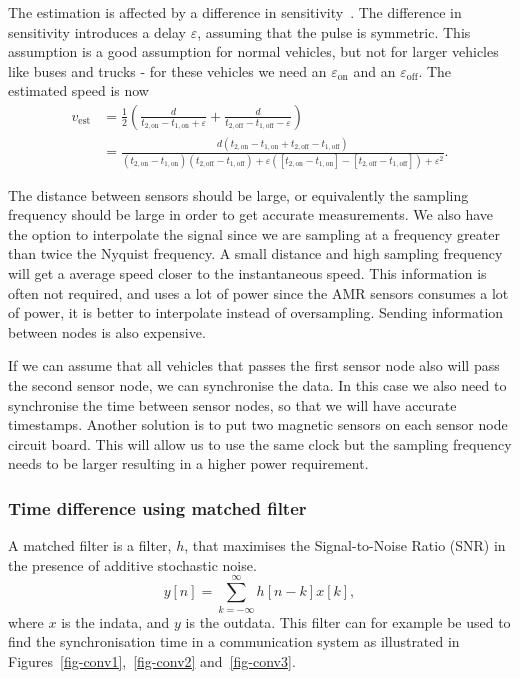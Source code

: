 The estimation is affected by a difference in sensitivity~\cite{path2007}. The difference in sensitivity introduces a delay $\varepsilon$, assuming that the pulse is symmetric. This assumption is a good assumption for normal vehicles, but not for larger vehicles like buses and trucks - for these vehicles we need an $\varepsilon_\text{on}$ and an $\varepsilon_\text{off}$. The estimated speed is now
\begin{align}
 v_{\text{est}} &= \frac{1}{2}\left(\frac{d}{t_{2,\text{on}}-t_{1,\text{on}} + \varepsilon} + \frac{d}{t_{2,\text{off}} - t_{1,\text{off}} - \varepsilon}\right)\\
 & =\frac{d\left(t_{2,\text{on}}-t_{1,\text{on}}+ t_{2,\text{off}} - t_{1,\text{off}}\right)}{(t_{2,\text{on}}-t_{1,\text{on}})(t_{2,\text{off}} - t_{1,\text{off}})+ \varepsilon\left([t_{2,\text{on}}-t_{1,\text{on}}]- [t_{2,\text{off}} - t_{1,\text{off}}]\right) + \varepsilon^2}.
\end{align}

The distance between sensors should be large, or equivalently the sampling frequency should be large in order to get accurate measurements. We also have the option to interpolate the signal since we are sampling at a frequency greater than twice the Nyquist frequency. A small distance and high sampling frequency will get a average speed closer to the instantaneous speed. This information is often not required, and uses a lot of power since the AMR sensors consumes a lot of power, it is better to interpolate instead of oversampling. Sending information between nodes is also expensive. %

If we can assume that all vehicles that passes the first sensor node also will pass the second sensor node, we can synchronise the data. In this case we also need to synchronise the time between sensor nodes, so that we will have accurate timestamps. Another solution is to put two magnetic sensors on each sensor node circuit board. This will allow us to use the same clock but the sampling frequency needs to be larger resulting in a higher power requirement.

\subsubsection{Time difference using matched filter}
A matched filter is a filter, $h$, that maximises the Signal-to-Noise Ratio (SNR) in the presence of additive stochastic noise.
\begin{equation}
 y[n] = \sum_{k=-\infty}^{\infty} h[n-k] x[k],
\end{equation}
where $x$ is the indata, and $y$ is the outdata. This filter can for example be used to find the synchronisation time in a communication system as illustrated in Figures~\ref{fig-conv1},~\ref{fig-conv2} and~\ref{fig-conv3}.

